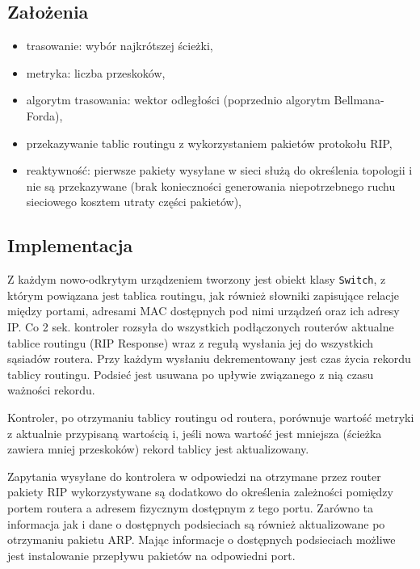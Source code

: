 \documentclass{article}
\begin{document}
	\subsection{Założenia}
	\begin{itemize}
		\item trasowanie: wybór najkrótszej ścieżki,
		\item metryka: liczba przeskoków,
		\item algorytm trasowania: wektor odległości (poprzednio algorytm Bellmana-Forda),
		\item przekazywanie tablic routingu z wykorzystaniem pakietów protokołu RIP,
		\item reaktywność: pierwsze pakiety wysyłane w sieci służą do określenia topologii i nie są przekazywane (brak konieczności generowania niepotrzebnego ruchu sieciowego kosztem utraty części pakietów),
	\end{itemize}
	
	\subsection{Implementacja}	
	Z każdym nowo-odkrytym urządzeniem tworzony jest obiekt klasy \texttt{Switch}, z którym powiązana jest tablica routingu, jak również słowniki zapisujące relacje między portami, adresami MAC dostępnych pod nimi urządzeń oraz ich adresy IP. Co 2 sek. kontroler rozsyła do wszystkich podłączonych routerów aktualne tablice routingu (RIP Response) wraz z regułą wysłania jej do wszystkich sąsiadów routera. Przy każdym wysłaniu dekrementowany jest czas życia rekordu tablicy routingu. Podsieć jest usuwana po upływie związanego z nią czasu ważności rekordu.
	
	Kontroler, po otrzymaniu tablicy routingu od routera, porównuje wartość metryki z aktualnie przypisaną wartością i, jeśli nowa wartość jest mniejsza (ścieżka zawiera mniej przeskoków) rekord tablicy jest aktualizowany.
	
	Zapytania wysyłane do kontrolera w odpowiedzi na otrzymane przez router pakiety RIP wykorzystywane są dodatkowo do określenia zależności pomiędzy portem routera a adresem fizycznym dostępnym z tego portu. Zarówno ta informacja jak i dane o dostępnych podsieciach są również aktualizowane po otrzymaniu pakietu ARP. Mając informacje o dostępnych podsieciach możliwe jest instalowanie przepływu pakietów na odpowiedni port.
	
\end{document}
